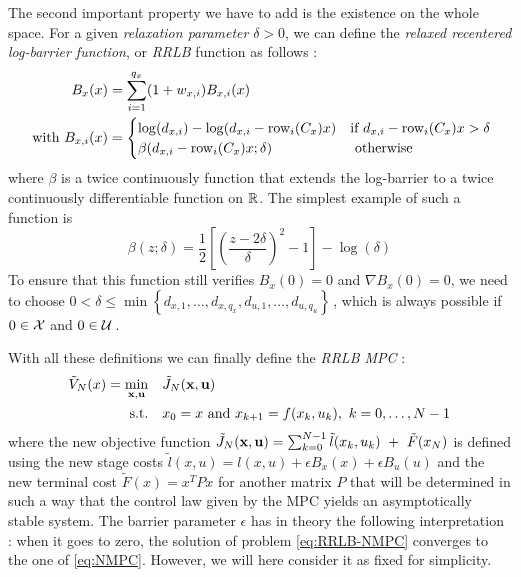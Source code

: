 \documentclass[12pt]{article}
\begin{document}
The second important property we have to add is the existence on the whole space.
For a given \textit{relaxation parameter} $\delta>0$, we can define the \textit{relaxed recentered log-barrier function}, or \textit{RRLB} function as follows :
\begin{align}
	\begin{split}
		\label{RRLB}
		B_x(x)&=\sum_{i=1}^{q_x}(1+w_{x,i})B_{x,i}(x)\\
		\text{ with }B_{x,i}(x)&=\begin{cases}
			\log(d_{x,i})-\log(d_{x,i}-\rm{row}_i(C_x)x)&\text{if }d_{x,i}-\rm{row}_i(C_x)x>\delta\\
			\beta(d_{x,i}-\rm{row}_i(C_x)x;\delta)&\text{ otherwise}
		\end{cases}
	\end{split}
\end{align}
where $\beta$ is a twice continuously function that extends the log-barrier to a twice continuously differentiable function on $\R$.
The simplest example of such a function is
$$\beta(z;\delta)=\frac{1}{2}\left[ \left( \frac{z-2\delta}{\delta} \right)^2-1 \right]-\log(\delta)$$
To ensure that this function still verifies $B_x(0)=0$ and $\nabla B_x(0)=0$, we need to choose $0<\delta\leq\min\left\{d_{x,1},\dots,d_{x,q_x},d_{u,1},\dots,d_{u,q_u}\right\}$\,, which is always possible if $0\in\cal{X}$ and $0\in\cal{U}$\,.

\vspace{24pt}

With all these definitions we can finally define the \textit{RRLB MPC} :
\begin{align}
	\begin{split}\label{eq:RRLB-NMPC}
		\tilde{V}_N(x)=\underset{\bf{x},\bf{u}}{\min} &\quad \tilde{J}_N(\bf{x},\bf{u})\\
		\text{s.t.} &\quad x_0=x\text{ and }x_{k+1}=f(x_k,u_k),~k=0,\dots,N-1\\
	\end{split}
\end{align}
where the new objective function $\tilde{J}_N(\bf{x},\bf{u})=\sum_{k=0}^{N-1}\tilde{l}(x_k,u_k)~+~\tilde{F}(x_N)$ is defined using the new stage costs $\tilde{l}(x,u)=l(x,u)+\epsilon B_x(x)+\epsilon B_u(u)$ and the new terminal cost $\tilde{F}(x)=x^TPx$ for another matrix $P$ that will be determined in such a way that the control law given by the MPC yields an asymptotically stable system.
The barrier parameter $\epsilon$ has in theory the following interpretation : when it goes to zero, the solution of problem \ref{eq:RRLB-NMPC} converges to the one of \ref{eq:NMPC}.
However, we will here consider it as fixed for simplicity.
\end{document}
